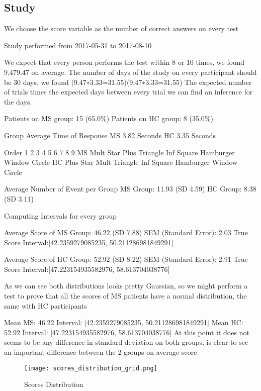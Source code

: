 \documentclass[letterpaper, 10 pt, conference]{ieeeconf}
\begin{document}
\subsection{Study}
We choose the score variable as the number of correct answers on every test

Study performed from 2017-05-31 to 2017-08-10

We expect that every person performs the test within 8 or 10 times, we found  9.479.47  on average.
The number of days of the study on every participant should be 30 days, we found  (9.47∗3.33=31.55)(9.47∗3.33=31.55)  The expected number of trials times the expected days between every trial we can find an inference for the days.

Patients on MS group: 15 (65.0\%)
Patients on HC group: 8 (35.0\%) 

Group	Average Time of Response
MS	3.82 Seconds
HC	3.35 Seconds

Order	1	2	3	4	5	6	7	8	9
MS	Mult	Star	Plus	Triangle	Inf	Square	Hamburger	Window	Circle
HC	Plus	Star	Mult	Triangle	Inf	Square	Hamburger	Window	Circle

Average Number of Event per Group 
 MS Group: 11.93 (SD 4.59) 
 HC Group: 8.38 (SD 3.11)

Computing Intervals for every group 

Average Score of MS Group: 46.22 (SD 7.88) 
SEM (Standard Error): 2.03 
True Score Interval:[42.2359279085235, 50.211286981849291]

Average Score of HC Group: 52.92 (SD 8.22)
SEM (Standard Error): 2.91 
True Score Interval:[47.223154935582976, 58.613704038776]

As we can see both distributions looks pretty Gaussian, so we might perform a test to prove that all the scores of MS patients have a normal distribution, the same with HC participants

Mean MS: 46.22 Interval: [42.2359279085235, 50.211286981849291]
Mean HC: 52.92 Interval: [47.223154935582976, 58.613704038776]
At this point it does not seems to be any difference in standard deviation on both groups, is clear to see an important difference between the 2 groups on average score

\begin{figure}[ht]
\texttt{[image: scores\_distribution\_grid.png]}
\caption{Scores Distribution}
\label{tab:scores}
\end{figure}

\vspace{2mm}
\end{document}
